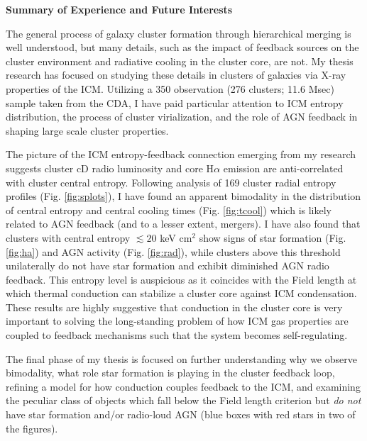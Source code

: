 \documentclass[11pt]{article}
\begin{document}
\begin{center}
\large
\textbf{Summary of Experience and Future Interests}
\normalsize
\end{center}

The general process of galaxy cluster formation through hierarchical
merging is well understood, but many details, such as the impact of
feedback sources on the cluster environment and radiative cooling in
the cluster core, are not. My thesis research has focused on studying
these details in clusters of galaxies via X-ray properties of the
ICM. Utilizing a 350 observation (276 clusters; 11.6 Msec) sample
taken from the CDA, I have paid particular attention to ICM entropy
distribution, the process of cluster virialization, and the role of
AGN feedback in shaping large scale cluster properties.

The picture of the ICM entropy-feedback connection emerging from my
research suggests cluster cD radio luminosity and core H$\alpha$
emission are anti-correlated with cluster central entropy. Following
analysis of 169 cluster radial entropy profiles
(Fig. \ref{fig:splots}), I have found an apparent bimodality in the
distribution of central entropy and central cooling times
(Fig. \ref{fig:tcool}) which is likely related to AGN feedback (and to
a lesser extent, mergers). I have also found that clusters with
central entropy $\lesssim 20$ keV cm$^2$ show signs of star formation
(Fig. \ref{fig:ha}) and AGN activity (Fig. \ref{fig:rad}), while
clusters above this threshold unilaterally do not have star formation
and exhibit diminished AGN radio feedback. This entropy level is
auspicious as it coincides with the Field length at which thermal
conduction can stabilize a cluster core against ICM
condensation. These results are highly suggestive that conduction in
the cluster core is very important to solving the long-standing
problem of how ICM gas properties are coupled to feedback mechanisms
such that the system becomes self-regulating.

The final phase of my thesis is focused on further understanding why
we observe bimodality, what role star formation is playing in the cluster
feedback loop, refining a model for how conduction couples feedback to
the ICM, and examining the peculiar class of objects which fall below
the Field length criterion but {\it do not} have star formation and/or
radio-loud AGN (blue boxes with red stars in two of the figures).
\end{document}
